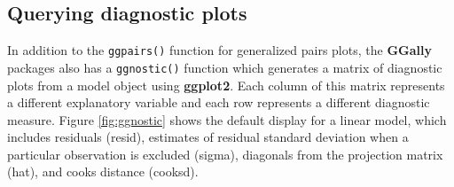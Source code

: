 \documentclass[
  12pt,
]{krantz}
\newenvironment{Shaded}{\begin{snugshade}}{\end{snugshade}}
\newcommand{\CommentTok}[1]{\textcolor[rgb]{0.56,0.35,0.01}{\textit{#1}}}
\newcommand{\DataTypeTok}[1]{\textcolor[rgb]{0.13,0.29,0.53}{#1}}
\newcommand{\KeywordTok}[1]{\textcolor[rgb]{0.13,0.29,0.53}{\textbf{#1}}}
\newcommand{\NormalTok}[1]{#1}
\newcommand{\OperatorTok}[1]{\textcolor[rgb]{0.81,0.36,0.00}{\textbf{#1}}}
\newcommand{\StringTok}[1]{\textcolor[rgb]{0.31,0.60,0.02}{#1}}
\begin{document}
\hypertarget{ggally-ggnostic}{%
\subsection{Querying diagnostic plots}\label{ggally-ggnostic}}

In addition to the \texttt{ggpairs()} function for generalized pairs plots, the \textbf{GGally} packages also has a \texttt{ggnostic()} function which generates a matrix of diagnostic plots from a model object using \textbf{ggplot2}. Each column of this matrix represents a different explanatory variable and each row represents a different diagnostic measure. Figure \ref{fig:ggnostic} shows the default display for a linear model, which includes residuals (resid), estimates of residual standard deviation when a particular observation is excluded (sigma), diagonals from the projection matrix (hat), and cooks distance (cooksd).

\begin{Shaded}
\end{Shaded}
\end{document}
